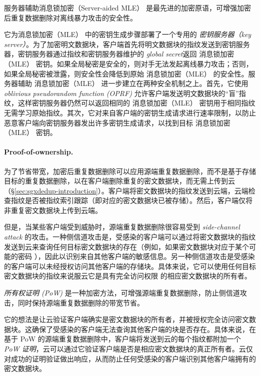 服务器辅助消息锁加密（Server-aided MLE）\cite{bellare2013DupLESS} 是最先进的加密原语，可增强加密后重复数据删除对离线暴力攻击的安全性。

它为消息锁加密（MLE） 中的密钥生成步骤部署了一个专用的 \textit{ 密钥服务器（key server）}。为了加密明文数据块，客户端首先将明文数据块的指纹发送到密钥服务器，密钥服务器通过指纹和密钥服务器维护的\textit{ global secret}返回 消息锁加密（MLE） 密钥。如果全局秘密是安全的，则对手无法发起离线暴力攻击；否则，如果全局秘密被泄露，则安全性会降低到原始 消息锁加密（MLE） 的安全性。服务器辅助 消息锁加密（MLE） 进一步建立在两种安全机制之上。首先，它使用 \textit{ oblivious pseudorandom function (OPRF)} \cite{naor2004Number} 允许客户端发送明文数据块的“盲”指纹，这样密钥服务器仍然可以返回相同的 消息锁加密（MLE） 密钥用于相同指纹无需学习原始指纹。其次，它对来自客户端的密钥生成请求进行速率限制，以防止恶意客户端向密钥服务器发出许多密钥生成请求，以找到目标 消息锁加密（MLE） 密钥。

\paragraph*{Proof-of-ownership.} 为了节省带宽，加密后重复数据删除可以应用源端重复数据删除，而不是基于存储目标的重复数据删除，以在客户端删除重复的密文数据块，而无需上传到云（\S\ref{sec:sgxdedup-introduction}）。客户端将密文数据块的指纹发送到云端，云端检查指纹是否被指纹索引跟踪（即对应的密文数据块已被存储）。然后，客户端仅将非重复密文数据块上传到云端。


但是，当某些客户端受到威胁时，源端重复数据删除很容易受到 \textit{ side-channel attack} \cite{harnik2010side,halevi11} 的攻击。一种侧信道攻击是，受感染的客户端可以通过将密文数据块的指纹发送到云来查询任何目标密文数据块的存在（例如，如果密文数据块对应于某个可能的密码 \cite{harnik2010side}），因此以识别来自其​​他客户端的敏感信息。另一种侧信道攻击是受感染的客户端可以未经授权访问其他客户端的存储块。具体来说，它可以使用任何目标密文数据块的指纹来说服云它是具有完全访问权限 \cite{halevi11} 的相应密文数据块的所有者。


\textit{ 所有权证明 (PoW)} \cite{halevi11} 是一种加密方法，可增强源端重复数据删除，防止侧信道攻击，同时保持源端重复数据删除的带宽节省。

它的想法是让云验证客户端确实是密文数据块的所有者，并被授权完全访问密文数据块。这确保了受感染的客户端无法查询其他客户端的块是否存在。具体来说，在基于 PoW 的源端重复数据删除中，客户端将发送到云的每个指纹都附加一个 \textit{ PoW 证明}，云可以通过它验证客户端是否是相应密文数据块的真正所有者。云仅对成功的证明验证做出响应，从而防止任何受感染的客户端识别其他客户端拥有的密文数据块。 

